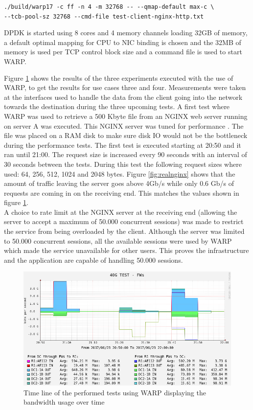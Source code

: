 \begin{verbatim}
./build/warp17 -c ff -n 4 -m 32768 -- --qmap-default max-c \
--tcb-pool-sz 32768 --cmd-file test-client-nginx-http.txt 
\end{verbatim} 

DPDK is started using 8 cores and 4 memory channels loading 32GB of memory, a default optimal mapping for CPU to NIC binding is chosen and the 32MB of memory is used per TCP control block size and a command file is used to start WARP.

Figure \ref{fig:warptime} shows the results of the three experiments executed with the use of WARP, to get the results for use cases three and four.
Measurements were taken at the interfaces used to handle the data from the client going into the network towards the destination during the three upcoming tests.
A first test where WARP was used to retrieve a 500 Kbyte file from an NGINX web server running on server A was executed. This NGINX server was tuned for performance \cite{nginxtuning}.
The file was placed on a RAM disk to make sure disk IO would not be the bottleneck during the performance tests. 
The first test is executed starting at 20:50 and it ran until 21:00. The request size is increased every 90 seconds with an interval of 30 seconds between the tests.
During this test the following request sizes where used: 64, 256, 512, 1024 and 2048 bytes. 
Figure \ref{fig:realnginx} shows that the amount of traffic leaving the server goes above 4Gb/s while only 0.6 Gb/s of requests are coming in on the receiving end. 
This matches the values shown in figure \ref{fig:warptime}. \\
A choice to rate limit at the NGINX server at the receiving end (allowing the server to accept a maximum of 50.000 concurrent sessions) was made to restrict the service from being overloaded by the client. Although the server was limited to 50.000 concurrent sessions, all the available sessions were used by WARP which made the service unavailable for other users.
This proves the infrastructure and the application are capable of handling 50.000 sessions.

\begin{figure}[H]
  \includegraphics[scale=0.5]{images/warp-timeline.png}
  \caption{Time line of the performed tests using WARP displaying the bandwidth usage over time}
  \label{fig:warptime}
\end{figure}

